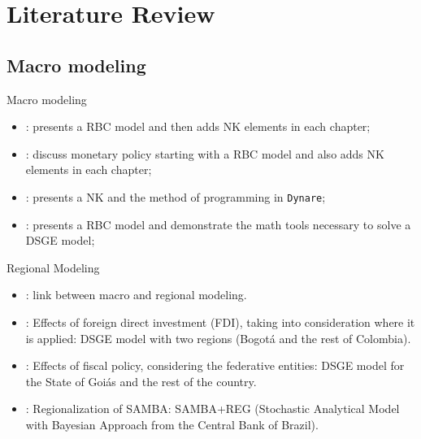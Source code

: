 \documentclass[../quali_slides.tex]{subfiles}
\begin{document}
\section{Literature Review}


\subsection{Macro modeling}

\begin{frame}[fragile]{Macro modeling}
	
	\begin{itemize}
		
		\item \textcite{costa_junior_understanding_2016}: presents a RBC model and then adds NK elements in each chapter;
		
		\item \textcite{gali_monetary_2015}: discuss monetary policy starting with a RBC model and also adds NK elements in each chapter;
		
		\item \textcite{bergholt_basic_2012}: presents a NK and the method of programming in \texttt{Dynare};
		
		\item \textcite{solis-garcia_ucb_2022}: presents a RBC model and demonstrate the math tools necessary to solve a DSGE model;
				
	\end{itemize}
	
\end{frame}


\begin{frame}[fragile]{Regional Modeling}

\begin{itemize}

	\item \textcite{rickman_modern_2010}: link between macro and regional modeling.

	\item \textcite{mora_fdi_2019}: Effects of foreign direct investment (FDI), taking into consideration where it is applied: DSGE model with two regions (Bogotá and the rest of Colombia).

	\item \textcite{costa_junior_dsge_2022}: Effects of fiscal policy, considering the federative entities: DSGE model for the State of Goiás and the rest of the country.
	
	\item \textcite{osterno_uma_2022}: Regionalization of SAMBA: SAMBA+REG (Stochastic Analytical Model with Bayesian Approach from the Central Bank of Brazil).
	
\end{itemize}
		
\end{frame}
\end{document}
